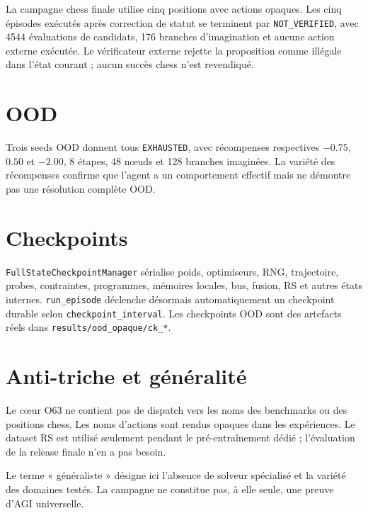 \documentclass[11pt,a4paper]{article}
\newcommand{\code}[1]{\texttt{#1}}
\begin{document}
La campagne chess finale utilise cinq positions avec actions opaques. Les cinq épisodes exécutés après correction de statut se terminent par \code{NOT\_VERIFIED}, avec 4544 évaluations de candidats, 176 branches d’imagination et aucune action externe exécutée. Le vérificateur externe rejette la proposition comme illégale dans l’état courant ; aucun succès chess n’est revendiqué.

\section{OOD}
Trois seeds OOD donnent tous \code{EXHAUSTED}, avec récompenses respectives $-0.75$, $0.50$ et $-2.00$, 8 étapes, 48 nœuds et 128 branches imaginées. La variété des récompenses confirme que l’agent a un comportement effectif mais ne démontre pas une résolution complète OOD.

\section{Checkpoints}
\code{FullStateCheckpointManager} sérialise poids, optimiseurs, RNG, trajectoire, probes, contraintes, programmes, mémoires locales, bus, fusion, RS et autres états internes. \code{run\_episode} déclenche désormais automatiquement un checkpoint durable selon \code{checkpoint\_interval}. Les checkpoints OOD sont des artefacts réels dans \code{results/ood\_opaque/ck\_*}.

\section{Anti-triche et généralité}
Le cœur O63 ne contient pas de dispatch vers les noms des benchmarks ou des positions chess. Les noms d’actions sont rendus opaques dans les expériences. Le dataset RS est utilisé seulement pendant le pré-entraînement dédié ; l’évaluation de la release finale n’en a pas besoin.

Le terme « généraliste » désigne ici l’absence de solveur spécialisé et la variété des domaines testés. La campagne ne constitue pas, à elle seule, une preuve d’AGI universelle.
\end{document}
